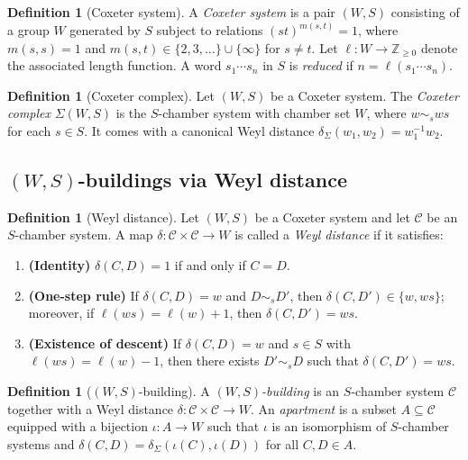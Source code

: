 \documentclass[11pt]{amsart}
\theoremstyle{definition}
\newtheorem{definition}[thm]{Definition}
\theoremstyle{remark}
\numberwithin{equation}{section}
\begin{document}
\begin{definition}[Coxeter system]\label{def:coxeter-system-abstract}
A \emph{Coxeter system} is a pair $(W,S)$ consisting of a group $W$ generated by $S$
subject to relations $(st)^{m(s,t)}=1$, where $m(s,s)=1$ and
$m(s,t)\in\{2,3,\dots\}\cup\{\infty\}$ for $s\neq t$.
Let $\ell:W\to \mathbb{Z}_{\ge 0}$ denote the associated length function.
A word $s_1\cdots s_n$ in $S$ is \emph{reduced} if $n=\ell(s_1\cdots s_n)$.
\end{definition}

\begin{definition}[Coxeter complex]\label{def:coxeter-complex-abstract}
Let $(W,S)$ be a Coxeter system.
The \emph{Coxeter complex} $\Sigma(W,S)$ is the $S$-chamber system with chamber set $W$,
where $w\sim_s ws$ for each $s\in S$.
It comes with a canonical Weyl distance $\delta_\Sigma(w_1,w_2)=w_1^{-1}w_2$.
\end{definition}

\subsection{\texorpdfstring{$(W,S)$}{(W,S)}-buildings via Weyl distance}\label{subsec:building-weyl-distance}

\begin{definition}[Weyl distance]\label{def:weyl-distance}
Let $(W,S)$ be a Coxeter system and let $\mathcal{C}$ be an $S$-chamber system.
A map $\delta\colon\mathcal{C}\times\mathcal{C}\to W$ is called a \emph{Weyl distance} if it satisfies:
\begin{enumerate}[label=(WD\arabic*), leftmargin=15mm]
\item \textbf{(Identity)} $\delta(C,D)=1$ if and only if $C=D$.
\item \textbf{(One-step rule)} If $\delta(C,D)=w$ and $D\sim_s D'$, then
$\delta(C,D')\in\{w,ws\}$; moreover, if $\ell(ws)=\ell(w)+1$, then $\delta(C,D')=ws$.
\item \textbf{(Existence of descent)} If $\delta(C,D)=w$ and $s\in S$ with $\ell(ws)=\ell(w)-1$,
then there exists $D'\sim_s D$ such that $\delta(C,D')=ws$.
\end{enumerate}
\end{definition}

\begin{definition}[$(W,S)$-building]\label{def:building-abstract}
A \emph{$(W,S)$-building} is an $S$-chamber system $\mathcal{C}$ together with a Weyl distance
$\delta\colon\mathcal{C}\times\mathcal{C}\to W$.
An \emph{apartment} is a subset $A\subseteq\mathcal{C}$ equipped with a bijection
$\iota:A\to W$ such that $\iota$ is an isomorphism of $S$-chamber systems and
$\delta(C,D)=\delta_\Sigma(\iota(C),\iota(D))$ for all $C,D\in A$.
\end{definition}
\end{document}
